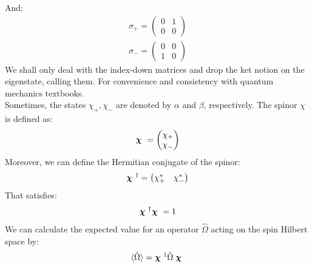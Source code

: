 And:
\begin{align*}
\sigma_+ =\begin{pmatrix}
0&1\\
0&0
\end{pmatrix}\\
\sigma_- =\begin{pmatrix}
0&0\\
1&0
\end{pmatrix}
\end{align*}
We shall only deal with the index-down matrices and drop the ket notion on the eigenstate, calling them. For convenience and consistency with quantum mechanics textbooks.\\ Sometimes, the states $ \chi_+ , \chi_-$ are denoted by $ \alpha$ and $\beta$, respectively. The spinor \boldmath${ \chi} $ is defined as:
\begin{equation}
\mbox{\boldmath $\chi$ } = \unboldmath\begin{pmatrix}
\chi_+\\\chi_-
\end{pmatrix}
\end{equation}
Moreover, we can define the Hermitian conjugate of the spinor:
\begin{equation}
\mbox{\boldmath $\chi$ }^\dagger = \unboldmath\begin{pmatrix}
\chi^*_+&\chi^*_-
\end{pmatrix}
\end{equation}
That satisfies:
\begin{equation}
\mbox{\boldmath $\chi$ }^\dagger  \mbox{\boldmath $\chi$ } =\unboldmath 1
\end{equation}
We can calculate the expected value for an operator $ \hat \Omega $ acting on the spin Hilbert space by:
\begin{equation}
\langle\hat \Omega \rangle = \mbox{\boldmath $\chi$ }^\dagger \unboldmath  \hat \Omega   \;	\mbox{\boldmath $\chi$ }
\end{equation}

